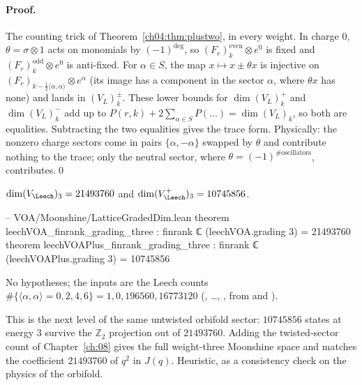 \paragraph{Proof.} The counting trick of Theorem~\ref{ch04:thm:plustwo}, in every weight. In charge
$0$, $\theta=\sigma\otimes1$ acts on monomials by $(-1)^{\deg}$, so $(F_r)_k^{\mathrm{even}}\otimes e^0$
is fixed and $(F_r)_k^{\mathrm{odd}}\otimes e^0$ is anti-fixed. For $\alpha\in S$, the map
$x\mapsto x\pm\theta x$ is injective on $(F_r)_{k-\frac12\langle\alpha,\alpha\rangle}\otimes e^\alpha$ (its image
has a component in the sector $\alpha$, where $\theta x$ has none) and lands in $(V_L)^\pm_k$. These
lower bounds for $\dim(V_L)^+_k$ and $\dim(V_L)^-_k$ add up to $P(r,k)+2\sum_{\alpha\in S}P(\dots)=\dim(V_L)_k$,
so both are equalities. Subtracting the two equalities gives the trace form. Physically: the
nonzero charge sectors come in pairs $\{\alpha,-\alpha\}$ swapped by $\theta$ and contribute nothing to
the trace; only the neutral sector, where $\theta=(-1)^{\#\text{oscillators}}$, contributes.\qed

\begin{theorem}\label{ch04:thm:wt3}
$\dim(V_\Leech)_3=21493760$ and $\dim(V_\Leech^+)_3=10745856$.
\end{theorem}

\begin{leancode}
-- VOA/Moonshine/LatticeGradedDim.lean
theorem leechVOA_finrank_grading_three : finrank ℂ (leechVOA.grading 3) = 21493760
theorem leechVOAPlus_finrank_grading_three : finrank ℂ (leechVOAPlus.grading 3) = 10745856
\end{leancode}

\begin{dictionary}
No hypotheses; the inputs are the Leech counts $\#\{\langle\alpha,\alpha\rangle=0,2,4,6\}=1,0,196560,16773120$
(, \dots, , from
 and ).
\end{dictionary}

\begin{physics}
This is the next level of the same untwisted orbifold sector: $10745856$ states at energy $3$ survive the $\mathbb Z_2$ projection out of $21493760$. Adding the twisted-sector count of Chapter~\ref{ch:08} gives the full weight-three Moonshine space and matches the coefficient $21493760$ of $q^2$ in $J(q)$. Heuristic, as a consistency check on the physics of the orbifold.
\end{physics}

